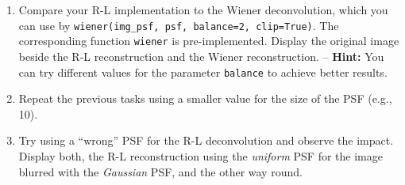\documentclass[12pt,a4paper]{article}
\begin{document}
\begin{enumerate}
    \item Compare your R-L implementation to the Wiener deconvolution, which you can use by \texttt{wiener(img\_psf, psf, balance=2, clip=True)}. The corresponding function \texttt{wiener} is pre-implemented. Display the original image beside the R-L reconstruction and the Wiener reconstruction. -- \textbf{Hint:} You can try different values for the parameter \texttt{balance} to achieve better results.
    \item Repeat the previous tasks using a smaller value for the size of the PSF (e.g., 10).
    \item Try using a ``wrong'' PSF for the R-L deconvolution and observe the impact. Display both, the R-L reconstruction using the \emph{uniform} PSF for the image blurred with the \emph{Gaussian} PSF, and the other way round.
\end{enumerate}
\end{document}
